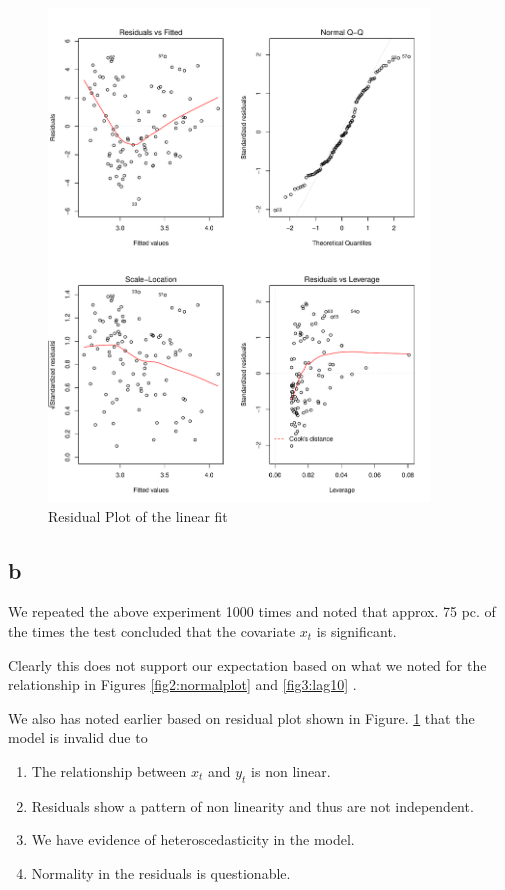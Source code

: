 \documentclass{article}
\begin{document}
\begin{figure}
	\centering
	\includegraphics[width=0.9\textwidth]{Residualplot}
	\caption{Residual Plot of the linear fit }
	\label{fig:Residual-Plot}
\end{figure}

\newpage

\subsection{b}

We repeated the above experiment 1000 times and noted that approx. 75 pc. of the times the test concluded that the covariate $x_t$ is significant. 

Clearly this does not support our expectation based on what we noted for the relationship in Figures \ref{fig2:normalplot} and \ref{fig3:lag10} . 

We also has noted earlier based on residual plot shown in Figure. \ref{fig:Residual-Plot} that the model is invalid due to 

\begin{enumerate}
	\item  The relationship between $x_t$ and $y_t$ is non linear.
	\item  Residuals show a pattern of non linearity and thus are not independent. 
	\item  We have evidence of heteroscedasticity in the model.
	\item  Normality in the residuals is questionable. 
\end{enumerate}
\end{document}
